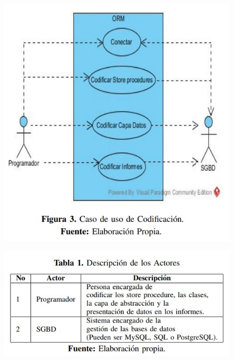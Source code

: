 \begin{flushleft}
\begin{itemize}
\begin{center}
    \includegraphics[width=12cm]{./Imagenes/ORM}
 \end{center}
\begin{center}
    \includegraphics[width=12cm]{./Imagenes/ACTORES}
 \end{center}
\end{itemize} 


\end{flushleft}